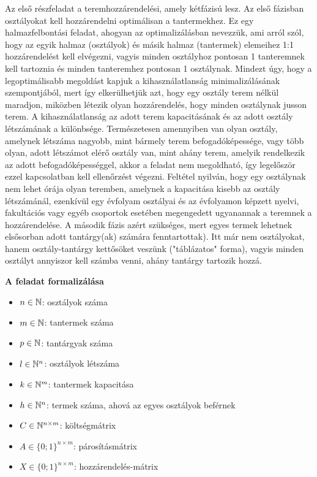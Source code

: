 \documentclass[a4paper,12pt]{article}
\begin{document}
Az első részfeladat a teremhozzárendelési, amely kétfázisú lesz. Az első fázisban osztályokat kell hozzárendelni optimálisan a tantermekhez. Ez egy halmazfelbontási feladat, ahogyan az optimalizálásban nevezzük, ami arról szól, hogy az egyik halmaz (osztályok) és másik halmaz (tantermek) elemeihez 1:1 hozzárendelést kell elvégezni, vagyis minden osztályhoz pontosan
1 tanteremnek kell tartoznia és minden tanteremhez pontosan 1 osztálynak. Mindezt úgy, hogy a legoptimálisabb megoldást kapjuk a kihasználatlanság minimalizálásának szempontjából, mert így elkerülhetjük azt, hogy egy osztály terem nélkül maradjon, miközben létezik olyan hozzárendelés, hogy minden osztálynak jusson terem. A kihasználatlanság az adott terem kapacitásának és az adott osztály létszámának a különbsége. Természetesen amennyiben van olyan osztály, amelynek létszáma nagyobb, mint bármely terem befogadóképessége, vagy több olyan, adott létszámot elérő osztály van, mint ahány terem, amelyik rendelkezik az adott befogadóképességgel, akkor a feladat nem megoldható, így legelőször ezzel kapcsolatban kell ellenőrzést végezni. Feltétel nyilván, hogy egy osztálynak nem lehet órája olyan teremben, amelynek a kapacitása kisebb az osztály létszámánál, ezenkívül egy évfolyam osztályai és az évfolyamon képzett nyelvi, fakultációs vagy egyéb csoportok esetében megengedett ugyanannak a teremnek a hozzárendelése. A második
fázis azért szükséges, mert egyes termek lehetnek elsősorban adott tantárgy(ak) számára fenntartottak). Itt már nem osztályokat, hanem osztály-tantárgy kettősöket veszünk ("táblázatos" forma), vagyis minden osztályt annyiszor kell számba venni, ahány tantárgy tartozik hozzá. 

\noindent \textbf{A feladat formalizálása}

\begin{itemize}
    \item $n \in \Bbb{N}$: osztályok száma
    \item $m \in \Bbb{N}$: tantermek száma
    \item $p \in \Bbb{N}$: tantárgyak száma
    \item $l \in \Bbb{N}^n$: osztályok létszáma
    \item $k \in \Bbb{N}^m$: tantermek kapacitása
    \item $h \in \Bbb{N}^n$: termek száma, ahová az egyes osztályok beférnek
    \item $C \in \Bbb{N}^{n \times m}$: költségmátrix
    \item $A \in \{0;1\}^{n \times m}$: párosításmátrix
    \item $X \in \{0;1\}^{n \times m}$: hozzárendelés-mátrix
\end{itemize}
\end{document}
